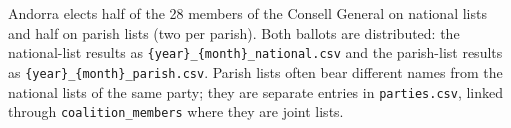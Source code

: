 Andorra elects half of the 28 members of the Consell General on national lists
and half on parish lists (two per parish).  Both ballots are distributed: the
national-list results as \texttt{\{year\}\_\{month\}\_national.csv} and the parish-list
results as \texttt{\{year\}\_\{month\}\_parish.csv}.  Parish lists often bear different
names from the national lists of the same party; they are separate entries in
\texttt{parties.csv}, linked through \texttt{coalition\_members} where they are
joint lists.
